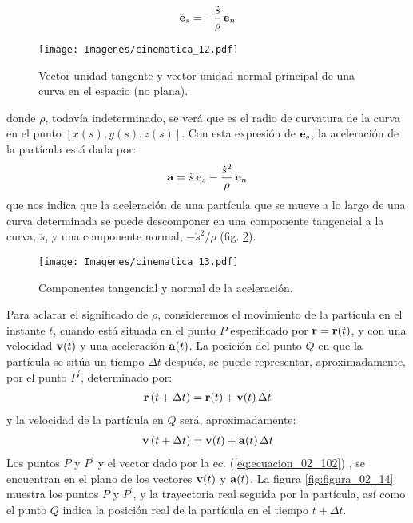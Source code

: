 \begin{align}
    \dot{\vb{e}}_{s} = - \dfrac{\dot{s}}{\rho} \, \vb{e}_{n}
    \label{eq:ecuacion_02_99}
\end{align}
\begin{figure}[H]
    \centering
    \texttt{[image: Imagenes/cinematica\_12.pdf]}
    \caption{Vector unidad tangente y vector unidad normal principal de una curva en el espacio (no plana).}
    \label{fig:figura_02_12}
\end{figure}
donde $\rho$, todavía indeterminado, se verá que es el radio de curvatura de la curva en el punto $\left[ x (s), y(s), z(s) \right]$. Con esta expresión de $\vb{e}_{s}$, la aceleración de la partícula está dada por:
\begin{align}
    \vb{a} = \ddot{s} \, \vb{e}_{s} - \dfrac{\dot{s}^{2}}{\rho} \, \vb{e}_{n}
    \label{eq:ecuacion_02_100}  
\end{align}
que nos indica que la aceleración de una partícula que se mueve a lo largo de una curva determinada se puede descomponer en una componente 
tangencial a la curva, $\ddot{s}$, y una componente normal, $- \dot{s}^{2}/\rho$ (fig. \ref{fig:figura_02_13}). 
\begin{figure}[H]
    \centering
    \texttt{[image: Imagenes/cinematica\_13.pdf]}
    \caption{Componentes tangencial y normal de la aceleración.}
    \label{fig:figura_02_13}
\end{figure}
Para aclarar el significado de $\rho$, consideremos el movimiento de la partícula en el instante $t$, cuando está situada en el punto $P$ especificado por $\vb{r} = \vb{r} (t)$, y con una velocidad $\vb{v} (t)$ y una aceleración $\vb{a} (t)$. La posición del punto $Q$ en que la partícula se sitúa un tiempo $\Delta t$ después, se puede representar, aproximadamente, por el punto $P^{\prime}$, determinado por: 
\begin{align}
    \vb{r} \left( t + \Delta t \right) = \vb{r} (t) + \vb{v} (t) \, \Delta t
    \label{eq:ecuacion_02_101}
\end{align}
y la velocidad de la partícula en $Q$ será, aproximadamente:
\begin{align}
    \vb{v} \left( t + \Delta t \right) = \vb{v} (t) + \vb{a} (t) \, \Delta t
    \label{eq:ecuacion_02_102}
\end{align}
Los puntos $P$ y $P^{\prime}$ y el vector dado por la ec. (\ref{eq:ecuacion_02_102}) , se encuentran en el plano de los vectores $\vb{v} (t)$ y $\vb{a} (t)$. La figura \ref{fig:figura_02_14} muestra los puntos $P$ y $P^{\prime}$, y la trayectoria real seguida por la partícula, así como el punto $Q$ indica la posición real de la partícula en el tiempo $t + \Delta t$. 
